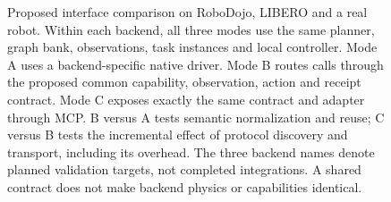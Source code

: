 \begin{figure}[t]
{}
\caption{Proposed interface comparison on RoboDojo, LIBERO and a real robot. Within each backend, all three modes use the same planner, graph bank, observations, task instances and local controller. Mode A uses a backend-specific native driver. Mode B routes calls through the proposed common capability, observation, action and receipt contract. Mode C exposes exactly the same contract and adapter through MCP. B versus A tests semantic normalization and reuse; C versus B tests the incremental effect of protocol discovery and transport, including its overhead. The three backend names denote planned validation targets, not completed integrations. A shared contract does not make backend physics or capabilities identical.}
\label{fig:platform}
\end{figure}
